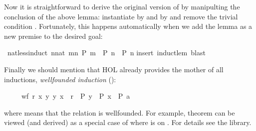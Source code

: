 \begin{isabellebody}
\begin{isamarkuptext}
Now it is straightforward to derive the original version of
 by manipulting the conclusion of the above lemma:
instantiate  by  and  by  and
remove the trivial condition . Fortunately, this
happens automatically when we add the lemma as a new premise to the
desired goal:%
\end{isamarkuptext}%
\ nat{\isacharunderscore}less{\isacharunderscore}induct{\isacharcolon}\ {\isachardoublequote}{\isacharparenleft}{\isasymAnd}n{\isacharcolon}{\isacharcolon}nat{\isachardot}\ {\isasymforall}m{\isacharless}n{\isachardot}\ P\ m\ {\isasymLongrightarrow}\ P\ n{\isacharparenright}\ {\isasymLongrightarrow}\ P\ n{\isachardoublequote}\isanewline
{}insert\ induct{\isacharunderscore}lem{\isacharcomma}\ blast{\isacharparenright}%
\begin{isamarkuptext}%
Finally we should mention that HOL already provides the mother of all
inductions, \emph{wellfounded induction} ():
\begin{isabelle}%
\ \ \ \ \ {\isasymlbrakk}wf\ r{\isacharsemicolon}\ {\isasymAnd}x{\isachardot}\ {\isasymforall}y{\isachardot}\ {\isacharparenleft}y{\isacharcomma}\ x{\isacharparenright}\ {\isasymin}\ r\ {\isasymlongrightarrow}\ P\ y\ {\isasymLongrightarrow}\ P\ x{\isasymrbrakk}\ {\isasymLongrightarrow}\ P\ a%
\end{isabelle}
where  means that the relation  is wellfounded.
For example, theorem  can be viewed (and
derived) as a special case of  where 
 is \isa{{\isacharless}} on . For details see the library.%
\end{isamarkuptext}%
\end{isabellebody}%
